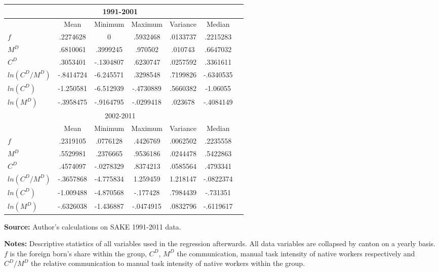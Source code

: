 \begin{threeparttable}
\begin{tabular}{lcccccc}
  \toprule
  \midrule
    \multicolumn{6}{c}{1991-2001}\\
    \hline
                            & Mean      & Minimum   & Maximum   & Variance  & Median \\
    \hline
    $f$                     & .2274628  & 0         & .5932468  & .0133737  & .2215283 \\
    $M^D$                   & .6810061  & .3999245  & .970502   & .010743   & .6647032 \\
    $C^D$                   & .3053401  & -.1304807 & .6230747  & .0257592  & .3361611 \\
    $ln(C^D/M^D)$           & -.8414724 & -6.245571 & .3298548  & .7199826  & -.6340535 \\
    $ln(C^D)$               & -1.250581 & -6.512939 & -.4730889 & .5660382  & -1.06055 \\
    $ln(M^D)$               & -.3958475 & -.9164795 & -.0299418 & .023678   & -.4084149 \\

    \hline
    \hline
    \multicolumn{6}{c}{2002-2011}\\
    \hline
                            & Mean      & Minimum   & Maximum   & Variance  & Median \\
    \hline
    $f$                     & .2319105  & .0776128  & .4426769  & .0062502  & .2235558 \\
    $M^D$                   & .5529981  & .2376665  & .9536186   & .0244478   & .5422863 \\
    $C^D$                   & .4574097  & -.0278329 & .8374213  & .0585564  & .4793341 \\
    $ln(C^D/M^D)$           & -.3657868 & -4.775834 & 1.259459  & 1.218147  & -.0822374 \\
    $ln(C^D)$               & -1.009488 & -4.870568 & -.177428 & .7984439  & -.731351 \\
    $ln(M^D)$               & -.6326038 & -1.436887 & -.0474915 & .0832796   & -.6119617 \\
\bottomrule
\end{tabular}
\begin{tablenotes}
  \small
  \item {\bf Source:} Author's calculations on SAKE 1991-2011 data.
  \item {\bf Notes:} Descriptive statistics of all variables used in the regression afterwards. All data variables are collapsed by canton on a yearly basis. $f$ is the foreign born's share within the group, $C^D$, $M^D$ the communication, manual task intensity of native workers respectively and $C^D/M^D$ the relative communication to manual task intensity of native workers within the group.
\end{tablenotes}
\end{threeparttable}